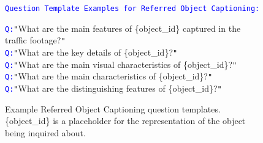\begin{figure*}[htbp]
\centering
\begin{tcolorbox}[colback=gray!10,%
	colframe=black,%
	width=\textwidth,
	arc=1mm, auto outer arc,
	boxrule=0.5pt,
	]
\texttt{\textcolor{blue}{Question Template Examples for Referred Object Captioning:}}
 
\texttt{\textcolor{blue}{Q:}}\texttt{"}What are the main features of \mbox{\{object\_id\}} captured in the traffic footage?\texttt{"}\\
\texttt{\textcolor{blue}{Q:}}\texttt{"}What are the key details of \mbox{\{object\_id\}}?\texttt{"}\\
\texttt{\textcolor{blue}{Q:}}\texttt{"}What are the main visual characteristics of \mbox{\{object\_id\}}?\texttt{"}\\
\texttt{\textcolor{blue}{Q:}}\texttt{"}What are the main characteristics of \mbox{\{object\_id\}}?\texttt{"}\\
\texttt{\textcolor{blue}{Q:}}\texttt{"}What are the distinguishing features of \mbox{\{object\_id\}}?\texttt{"}

\end{tcolorbox}
\caption{Example Referred Object Captioning question templates. \mbox{\{object\_id\}} is a placeholder for the representation of the object being inquired about.}
\label{fig:ref_obj_gr_qa_templates}
\end{figure*}


